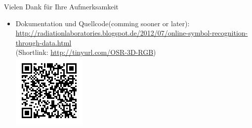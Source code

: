 \documentclass{VLKlauck}
\begin{document}
	
	   
	\begin{frame}{Vielen Dank für Ihre Aufmerksamkeit}
	    \begin{itemize}
	      \item Dokumentation und Quellcode(comming sooner or later):\\
	      {\small\url{http://radiationlaboratories.blogspot.de/2012/07/online-symbol-recognition-through-data.html}}\\
	       (Shortlink: \url{http://tinyurl.com/OSR-3D-RGB})\\ \includegraphics[scale=1]{qrLink.png}
	    \end{itemize}
	\end{frame} 
\end{document}
